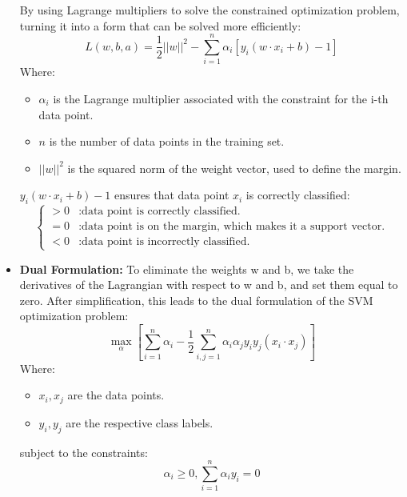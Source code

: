 \begin{itemize}
    By using Lagrange multipliers to solve the constrained optimization problem, turning it into a form that can be solved more efficiently:
    \begin{equation}
        \label{eq:equation14}
        L(w,b,a) = \frac{1}{2}||w||^2 - \sum^{n}_{i=1} \alpha_i [y_i(w \cdot x_i + b) - 1]
    \end{equation}
    Where:
    \begin{itemize}
        \item $\alpha_i$ is the Lagrange multiplier associated with the constraint for the i-th data point.
        \item $n$ is the number of data points in the training set.
        \item $||w||^2$ is the squared norm of the weight vector, used to define the margin.
    \end{itemize}

    $y_i(w \cdot x_i + b) - 1$ ensures that data point $x_i$ is correctly classified:
    \[\left\{
            \begin{array}{ll}
                > 0 & : \text{data point is correctly classified.} \\
                = 0 & : \text{data point is on the margin, which makes it a support vector.} \\
                < 0 & : \text{data point is incorrectly classified.}
            \end{array}
    \]

    \item \textbf{Dual Formulation:} To eliminate the weights w and b, we take the derivatives of the Lagrangian with respect to w and b, and set them equal to zero.
    After simplification, this leads to the dual formulation of the SVM optimization problem:
    \begin{equation}
        \label{eq:equation12}
        \max_\alpha \left[ \sum^{n}_{i=1} \alpha_i - \frac{1}{2} \sum_{i,j=1}^{n} \alpha_i \alpha_j y_i y_j (x_i \cdot x_j) \right]
    \end{equation}
    Where:
    \begin{itemize}
        \item $x_i, x_j$ are the data points.
        \item $y_i, y_j$ are the respective class labels.
    \end{itemize}

    subject to the constraints:
    \begin{equation}
        \label{eq:equation15}
        \alpha_i \geq 0, \sum^{n}_{i=1} \alpha_i y_i = 0
    \end{equation}


\end{itemize}

